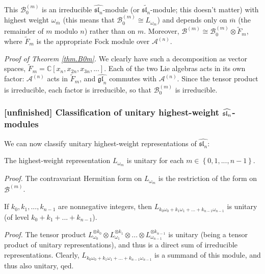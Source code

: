 \documentclass[etingof-lie.tex]{subfiles}
\begin{document}
\begin{theorem}
\label{thm.B0m}This $\mathcal{B}_{0}^{\left(  m\right)  }$ is an irreducible
$\widehat{\mathfrak{sl}_{n}}$-module (or $\widetilde{\mathfrak{sl}_{n}}%
$-module; this doesn't matter) with highest weight $\omega_{\overline{m}}$
(this means that $\mathcal{B}_{0}^{\left(  m\right)  }\cong L_{\omega
_{\overline{m}}}$) and depends only on $\overline{m}$ (the remainder of $m$
modulo $n$) rather than on $m$. Moreover, $\mathcal{B}^{\left(  m\right)
}\cong\mathcal{B}_{0}^{\left(  m\right)  }\otimes\widetilde{F}_{m}$, where
$\widetilde{F}_{m}$ is the appropriate Fock module over $\mathcal{A}^{\left(
n\right)  }$.
\end{theorem}

\textit{Proof of Theorem \ref{thm.B0m}.} We clearly have such a decomposition
as vector spaces, $\widetilde{F}_{m}=\mathbb{C}\left[  x_{n},x_{2n}%
,x_{3n},...\right]  $. Each of the two Lie algebras acts in its own factor:
$\mathcal{A}^{\left(  n\right)  }$ acts in $\widetilde{F}_{m}$, and
$\widehat{\mathfrak{gl}_{n}}$ commutes with $\mathcal{A}^{\left(  n\right)  }%
$. Since the tensor product is irreducible, each factor is irreducible, so
that $\mathcal{B}_{0}^{\left(  m\right)  }$ is irreducible.

\subsubsection{\textbf{[unfinished]} Classification of unitary highest-weight
\texorpdfstring{$\protect\widehat{\mathfrak{sl}_{n}}$}{sl-n-hat}-modules}

We can now classify unitary highest-weight representations of
$\widehat{\mathfrak{sl}_{n}}$:

\begin{proposition}
The highest-weight representation $L_{\omega_{m}}$ is unitary for each
$m\in\left\{  0,1,...,n-1\right\}  $.
\end{proposition}

\textit{Proof.} The contravariant Hermitian form on $L_{\omega_{m}}$ is the
restriction of the form on $\mathcal{B}^{\left(  m\right)  }$.

\begin{corollary}
If $k_{0},k_{1},...,k_{n-1}$ are nonnegative integers, then $L_{k_{0}%
\omega_{0}+k_{1}\omega_{1}+...+k_{n-1}\omega_{n-1}}$ is unitary (of level
$k_{0}+k_{1}+...+k_{n-1}$).
\end{corollary}

\textit{Proof.} The tensor product $L_{\omega_{0}}^{\otimes k_{0}}\otimes
L_{\omega_{1}}^{\otimes k_{1}}\otimes...\otimes L_{\omega_{n-1}}^{\otimes
k_{n-1}}$ is unitary (being a tensor product of unitary representations), and
thus is a direct sum of irreducible representations. Clearly, $L_{k_{0}%
\omega_{0}+k_{1}\omega_{1}+...+k_{n-1}\omega_{n-1}}$ is a summand of this
module, and thus also unitary, qed.
\end{document}

